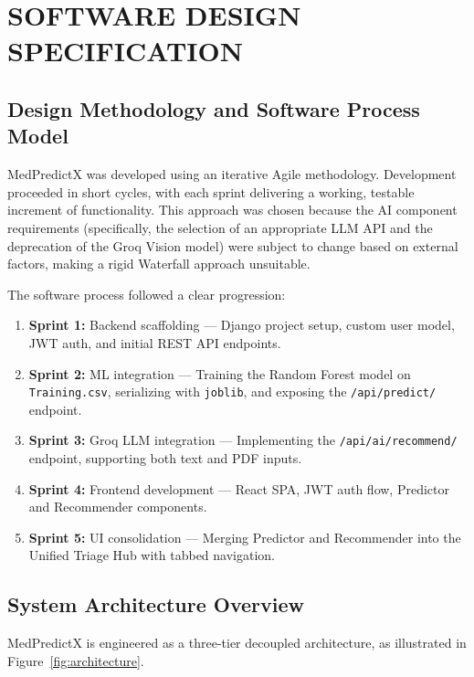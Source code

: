 \chapter{SOFTWARE DESIGN SPECIFICATION}

\section{Design Methodology and Software Process Model}

MedPredictX was developed using an iterative Agile methodology. Development proceeded in short cycles, with each sprint delivering a working, testable increment of functionality. This approach was chosen because the AI component requirements (specifically, the selection of an appropriate LLM API and the deprecation of the Groq Vision model) were subject to change based on external factors, making a rigid Waterfall approach unsuitable.

The software process followed a clear progression:
\begin{enumerate}
    \item \textbf{Sprint 1:} Backend scaffolding --- Django project setup, custom user model, JWT auth, and initial REST API endpoints.
    \item \textbf{Sprint 2:} ML integration --- Training the Random Forest model on \texttt{Training.csv}, serializing with \texttt{joblib}, and exposing the \texttt{/api/predict/} endpoint.
    \item \textbf{Sprint 3:} Groq LLM integration --- Implementing the \texttt{/api/ai/recommend/} endpoint, supporting both text and PDF inputs.
    \item \textbf{Sprint 4:} Frontend development --- React SPA, JWT auth flow, Predictor and Recommender components.
    \item \textbf{Sprint 5:} UI consolidation --- Merging Predictor and Recommender into the Unified Triage Hub with tabbed navigation.
\end{enumerate}

\section{System Architecture Overview}

MedPredictX is engineered as a three-tier decoupled architecture, as illustrated in Figure~\ref{fig:architecture}.


